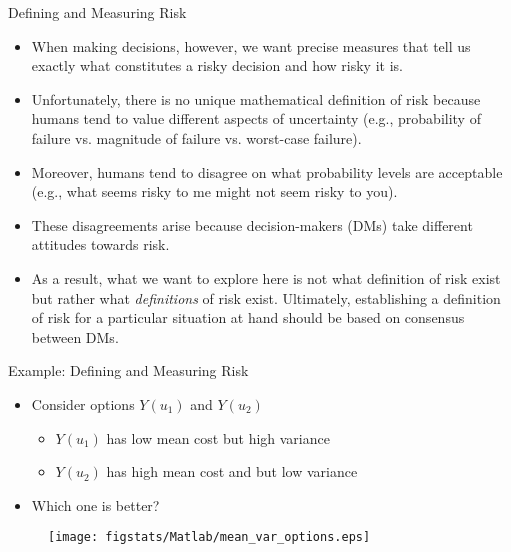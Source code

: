 \documentclass[9pt]{beamer}
\begin{document}
%
\begin{frame}{Defining and Measuring Risk}

\begin{itemize}

\item When making decisions, however, we want precise measures that tell us exactly what constitutes a risky decision and how risky it is. 

\item Unfortunately, there is no unique mathematical definition of risk because humans tend to value different aspects of  uncertainty (e.g., probability of failure vs. magnitude of failure vs. worst-case failure).  

\item Moreover, humans tend to disagree on what probability levels are acceptable (e.g., what seems risky to me might not seem risky to you).

\item These disagreements arise because decision-makers (DMs) take different attitudes towards risk. 

\item As a result, what we want to explore here is not what definition of risk exist but rather what {\em definitions} of risk exist. Ultimately, establishing a definition of risk for a particular situation at hand should be based on consensus between DMs. 

\end{itemize}

\end{frame}

%
\begin{frame}{Example: Defining and Measuring Risk}
\begin{itemize}
\item Consider options $Y(u_1)$ and $Y(u_2)$  
\begin{itemize}
\item $Y(u_1)$ has low mean cost but high variance 
\item $Y(u_2)$ has high mean cost and but low variance
\end{itemize}
\item Which one is better?
\end{itemize}
\begin{figure}[!htb]
    \centering
	\texttt{[image: figstats/Matlab/mean\_var\_options.eps]}
\end{figure}

\end{frame}
\end{document}
